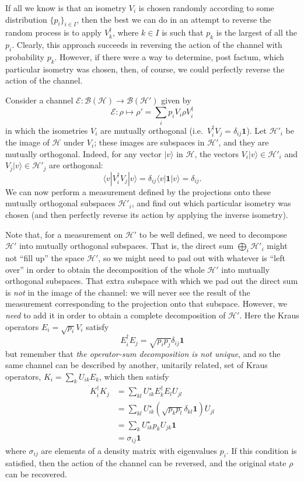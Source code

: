 \documentclass[fleqn]{article}
\begin{document}
If all we know is that an isometry \(V_i\) is chosen randomly according to some distribution \(\{p_i\}_{i\in I}\), then the best we can do in an attempt to reverse the random process is to apply \(V_k^\dagger\), where \(k\in I\) is such that \(p_k\) is the largest of all the \(p_i\).
Clearly, this approach succeeds in reversing the action of the channel with probability \(p_k\).
However, if there were a way to determine, post factum, which particular isometry was chosen, then, of course, we could perfectly reverse the action of the channel.

Consider a channel \(\mathcal{E}\colon\mathcal{B}(\mathcal{H})\to\mathcal{B}(\mathcal{H}')\) given by
\[
  \mathcal{E}\colon\rho
  \longmapsto \rho'
  =\sum_i p_i V_i\rho V^\dagger_i
\]
in which the isometries \(V_i\) are mutually orthogonal (i.e.~\(V_i^\dagger V_j =\delta_{ij}\mathbf{1}\)).
Let \(\mathcal{H}'_i\) be the image of \(\mathcal{H}\) under \(V_i\);
these images are subspaces in \(\mathcal{H}'\), and they are mutually orthogonal. Indeed, for any vector \(|v\rangle\) in \(\mathcal{H}\), the vectors \(V_i|v\rangle\in \mathcal{H}'_i\) and \(V_j|v\rangle\in \mathcal{H}'_j\) are orthogonal:
\[
  \langle v|V_i^\dagger V_j|v\rangle
  = \delta_{ij} \langle v|\mathbf{1}|v\rangle
  = \delta_{ij}.
\]
We can now perform a measurement defined by the projections onto these mutually orthogonal subspaces \(\mathcal{H}'_i\), and find out which particular isometry was chosen (and then perfectly reverse its action by applying the inverse isometry).

Note that, for a measurement on \(\mathcal{H}'\) to be well defined, we need to decompose \(\mathcal{H}'\) into mutually orthogonal subspaces.
That is, the direct sum \(\bigoplus_i\mathcal{H}'_i\) might not ``fill up'' the space \(\mathcal{H}'\), so we might need to pad out with whatever is ``left over'' in order to obtain the decomposition of the whole \(\mathcal{H}'\) into mutually orthogonal subspaces.
That extra subspace with which we pad out the direct sum is \emph{not} in the image of the channel: we will never see the result of the measurement corresponding to the projection onto that subspace.
However, we \emph{need} to add it in order to obtain a complete decomposition of \(\mathcal{H}'\).
Here the Kraus operators \(E_i=\sqrt{p_i}V_i\) satisfy
\[
  E^\dagger_i E_j
  = \sqrt{p_i p_j}\delta_{ij}\mathbf{1}
\]
but remember that \emph{the operator-sum decomposition is not unique}, and so the same channel can be described by another, unitarily related, set of Kraus operators, \(K_i = \sum_k U_{ik}E_k\), which then satisfy
\[
  \begin{aligned}
    K_i^\dagger K_j
    &= \sum_{kl} U^\star_{ik} E^\dagger_k E_l U_{jl}
  \\&= \sum_{kl} U^\star_{ik} (\sqrt{p_k p_l}\delta_{kl}\mathbf{1}) U_{jl}
  \\&= \sum_{k} U^\star_{ik} p_k U_{jk}\mathbf{1}
  \\&= \sigma_{ij}\mathbf{1}
  \end{aligned}
\]
where \(\sigma_{ij}\) are elements of a density matrix with eigenvalues \(p_i\).
If this condition is satisfied, then the action of the channel can be reversed, and the original state \(\rho\) can be recovered.
\end{document}

